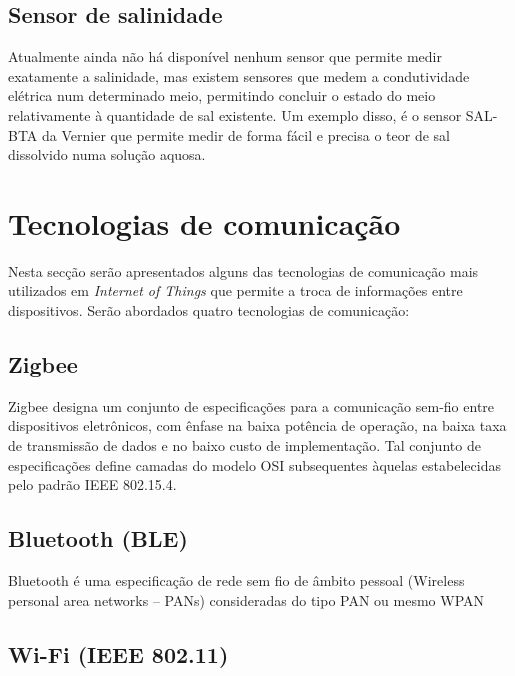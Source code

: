 \subsection{Sensor de salinidade}


Atualmente ainda não há disponível nenhum sensor que permite medir exatamente a salinidade, mas existem sensores que medem a condutividade elétrica num determinado meio, permitindo concluir o estado do meio relativamente à quantidade de sal existente. 
Um exemplo disso, é o sensor SAL-BTA da Vernier\cite{sall} que permite medir de forma fácil e precisa o teor de sal dissolvido numa solução aquosa.




\section{Tecnologias de comunicação}

Nesta secção serão apresentados alguns das tecnologias de comunicação mais utilizados em \textit{Internet of Things} que permite a troca de informações entre dispositivos. Serão abordados quatro tecnologias de comunicação:  







\subsection{Zigbee}

Zigbee designa um conjunto de especificações para a comunicação sem-fio entre dispositivos eletrônicos, com ênfase na baixa potência de operação, na baixa taxa de transmissão de dados e no baixo custo de implementação. Tal conjunto de especificações define camadas do modelo OSI subsequentes àquelas estabelecidas pelo padrão IEEE 802.15.4.









\subsection{Bluetooth (BLE)}

Bluetooth é uma especificação de rede sem fio de âmbito pessoal (Wireless personal area networks – PANs) consideradas do tipo PAN ou mesmo WPAN


\subsection{Wi-Fi (IEEE 802.11)}

